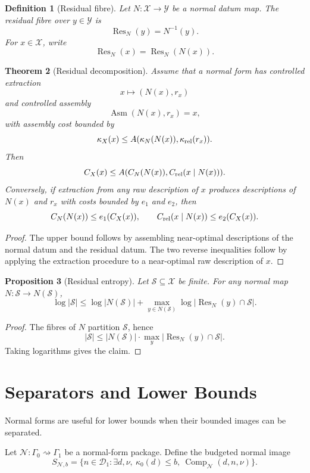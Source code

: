 \documentclass[11pt]{article}
\newtheorem{theorem}{Theorem}[section]
\newtheorem{proposition}[theorem]{Proposition}
\newtheorem{definition}[theorem]{Definition}
\DeclareMathOperator{\Comp}{Comp}
\DeclareMathOperator{\Res}{Res}
\begin{document}
\begin{definition}[Residual fibre]
Let \(N:\mathcal X\to\mathcal Y\) be a normal datum map. The residual fibre over \(y\in\mathcal Y\) is
\[
\Res_N(y)=N^{-1}(y).
\]
For \(x\in\mathcal X\), write
\[
\Res_N(x)=\Res_N(N(x)).
\]
\end{definition}

\begin{theorem}[Residual decomposition]
Assume that a normal form has controlled extraction
\[
x\mapsto (N(x),r_x)
\]
and controlled assembly
\[
\operatorname{Asm}(N(x),r_x)=x,
\]
with assembly cost bounded by
\[
\kappa_X(x)\leq A(\kappa_N(N(x)),\kappa_{\rm rel}(r_x)).
\]
Then
\[
C_X(x)\leq A(C_N(N(x)),C_{\rm rel}(x\mid N(x))).
\]
Conversely, if extraction from any raw description of \(x\) produces descriptions of \(N(x)\) and \(r_x\) with costs bounded by \(e_1\) and \(e_2\), then
\[
C_N(N(x))\leq e_1(C_X(x)),
\qquad
C_{\rm rel}(x\mid N(x))\leq e_2(C_X(x)).
\]
\end{theorem}

\begin{proof}
The upper bound follows by assembling near-optimal descriptions of the normal datum and the residual datum. The two reverse inequalities follow by applying the extraction procedure to a near-optimal raw description of \(x\).
\end{proof}

\begin{proposition}[Residual entropy]
Let \(\mathcal S\subseteq\mathcal X\) be finite. For any normal map \(N:\mathcal S\to N(\mathcal S)\),
\[
\log|\mathcal S|
\leq
\log|N(\mathcal S)|
+
\max_{y\in N(\mathcal S)}
\log|\Res_N(y)\cap\mathcal S|.
\]
\end{proposition}

\begin{proof}
The fibres of \(N\) partition \(\mathcal S\), hence
\[
|\mathcal S|
\leq
|N(\mathcal S)|\cdot
\max_y|\Res_N(y)\cap\mathcal S|.
\]
Taking logarithms gives the claim.
\end{proof}

\section{Separators and Lower Bounds}

Normal forms are useful for lower bounds when their bounded images can be separated.

Let \(\mathcal N:\Gamma_0\rightsquigarrow\Gamma_1\) be a normal-form package. Define the budgeted normal image
\[
S_{\mathcal N,b}
=
\{n\in\mathcal D_1:
\exists d,\nu,\ \kappa_0(d)\leq b,\ \Comp_{\mathcal N}(d,n,\nu)\}.
\]
\end{document}
